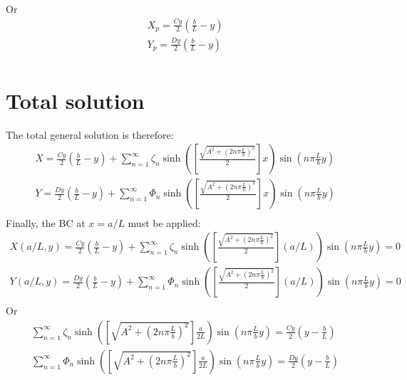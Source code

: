 \documentclass[11pt]{article}
\begin{document}
Or
\begin{equation}\begin{aligned}
X_p = \frac{C y}{2} \left(\frac{b}{L} - y \right) \\
Y_p = \frac{D y}{2} \left(\frac{b}{L} - y \right) \\
\end{aligned} \end{equation}

\section{Total solution}
The total general solution is therefore:
\begin{equation}\begin{aligned}
X = \frac{C y}{2} \left(\frac{b}{L} - y \right) + \sum_{n=1}^{\infty} \zeta_n \sinh \left( \left[\frac{\sqrt{A^2 + \left(2 n \pi \frac{L}{b} \right)^2}}{2}\right] x \right) \sin \left(n \pi \frac{L}{b} y \right) \\
Y = \frac{D y}{2} \left(\frac{b}{L} - y \right) + \sum_{n=1}^{\infty} \Phi_n  \sinh \left( \left[\frac{\sqrt{A^2 + \left(2 n \pi \frac{L}{b} \right)^2}}{2}\right] x \right) \sin \left(n \pi \frac{L}{b} y \right) \\
\end{aligned} \end{equation}
Finally, the BC at $x=a/L$ must be applied:
\begin{equation}\begin{aligned}
X(a/L,y) = \frac{C y}{2} \left(\frac{b}{L} - y \right) + \sum_{n=1}^{\infty} \zeta_n \sinh \left( \left[\frac{\sqrt{A^2 + \left(2 n \pi \frac{L}{b} \right)^2}}{2}\right] (a/L) \right) \sin \left(n \pi \frac{L}{b} y \right) = 0 \\
Y(a/L,y) = \frac{D y}{2} \left(\frac{b}{L} - y \right) + \sum_{n=1}^{\infty} \Phi_n  \sinh \left( \left[\frac{\sqrt{A^2 + \left(2 n \pi \frac{L}{b} \right)^2}}{2}\right] (a/L) \right) \sin \left(n \pi \frac{L}{b} y \right) = 0 \\
\end{aligned} \end{equation}
Or
\begin{equation}\begin{aligned}
\sum_{n=1}^{\infty} \zeta_n \sinh \left( \left[\sqrt{A^2 + \left(2 n \pi \frac{L}{b} \right)^2}\right] \frac{a}{2L} \right) \sin \left(n \pi \frac{L}{b} y \right) = \frac{C y}{2} \left(y - \frac{b}{L}\right) \\
\sum_{n=1}^{\infty} \Phi_n  \sinh \left( \left[\sqrt{A^2 + \left(2 n \pi \frac{L}{b} \right)^2}\right] \frac{a}{2L} \right) \sin \left(n \pi \frac{L}{b} y \right) = \frac{D y}{2} \left(y - \frac{b}{L}\right) \\
\end{aligned} \end{equation}
\end{document}
